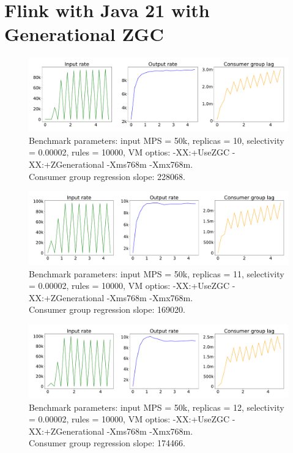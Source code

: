 \newpage

\section{Flink with Java 21 with Generational ZGC}\label{sec:flink-on-java-21-with-generational-zgc}

\begin{figure}[H]
    \centering
    \includegraphics[width=1\textwidth]{figures/flink-java-21-new-gc-replicas-10}
    \caption{Benchmark parameters: input MPS = 50k, replicas = 10, selectivity = 0.00002, rules = 10000,
        VM optios: -XX:+UseZGC -XX:+ZGenerational -Xms768m -Xmx768m. \\
    Consumer group regression slope: 228068.}
    \label{fig:flink-java-21-new-gc-replicas-10}
\end{figure}

\begin{figure}[H]
    \centering
    \includegraphics[width=1\textwidth]{figures/flink-java-21-new-gc-replicas-11}
    \caption{Benchmark parameters: input MPS = 50k, replicas = 11, selectivity = 0.00002, rules = 10000,
     VM optios: -XX:+UseZGC -XX:+ZGenerational -Xms768m -Xmx768m. \\
    Consumer group regression slope: 169020.}
    \label{fig:flink-java-21-new-gc-replicas-11}
\end{figure}

\begin{figure}[H]
    \centering
    \includegraphics[width=1\textwidth]{figures/flink-java-21-new-gc-replicas-12}
    \caption{Benchmark parameters: input MPS = 50k, replicas = 12, selectivity = 0.00002, rules = 10000,
        VM optios: -XX:+UseZGC -XX:+ZGenerational -Xms768m -Xmx768m. \\
    Consumer group regression slope: 174466.}
    \label{fig:flink-java-21-new-gc-replicas-12}
\end{figure}

